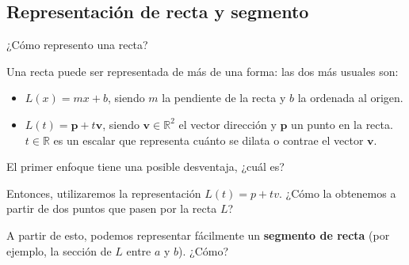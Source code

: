 \documentclass[compress]{beamer}
\newcommand{\bigpause}{\bigskip \pause}
\begin{document}
\subsection{Representaci\'on de recta y segmento}
\begin{frame}{¿C\'omo represento una recta?}

Una recta puede ser representada de m\'as de una forma: las dos m\'as usuales son:

\begin{itemize}
\item $L(x) = m x + b$, siendo $m$ la pendiente de la recta y $b$ la ordenada al origen.
\item $L(t) = \mathbf{p} + t \mathbf{v}$, siendo $\mathbf{v} \in \mathbb{R}^2$ el vector direcci\'on y 
$\mathbf{p}$ un punto en la recta. $t \in \mathbb{R}$ es un escalar que representa cu\'anto se dilata o contrae el vector $\mathbf{v}$.
\end{itemize}

El primer enfoque tiene una posible desventaja, ¿cu\'al es?

\bigpause
{}
\end{frame}

\begin{frame}

Entonces, utilizaremos la representaci\'on $L(t) = p + t v$. ¿C\'omo la obtenemos a partir de dos puntos que pasen por la recta $L$?

\bigpause
{}
\end{frame}

\begin{frame}

A partir de esto, podemos representar f\'acilmente un \textbf{segmento de recta} (por ejemplo, la secci\'on de $L$ entre $a$ y $b$). ¿C\'omo?

\bigpause
{}
\end{frame}
\end{document}
